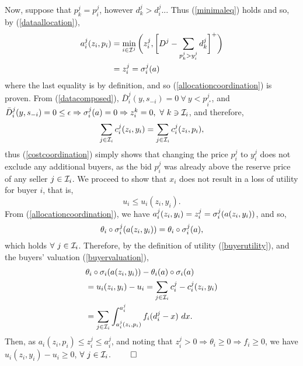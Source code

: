 {$$$$
Now, suppose that $p_k^j = p_i^j$, however $d_k^j > d_i^j$...
\fi
Thus (\ref{minimaleq}) holds and so, by (\ref{dataallocation}),
\begin{align*}
     a_i^j(z_i,p_i) &=\min_{i\in\mathcal{I}^j}\bigg(z_i^j, \bigg\lbrack D^{j} - \sum_{p_k^{j}> y_i^{j}}
d_k^{j}\bigg\rbrack^+\bigg) \\
    &= z_i^{j}= \sigma_i^{j}(a)
\end{align*}
where the last equality is by definition, and so (\ref{allocationcoordination}) is proven.
From (\ref{datacomposed}), $\bar{D}_i^j(y, s_{-i}) =
0 \ \forall \ y < p_{i^*}^j$, and $\bar{D}_i^j(y, s_{-i}) =0 \le \epsilon
\Rightarrow \sigma_i^j(a) = 0 \Rightarrow z_i^k = 0, \ \forall \ k \ni \mathcal{I}_i$, and therefore,
\begin{align*}
    \displaystyle\sum_{j\in\mathcal{I}_i} c_i^j(z_i,y_i) =\sum_{j\in\mathcal{I}_i}
c_i^j(z_i,p_i),
\end{align*}
thus (\ref{costcoordination}) simply shows that changing the price $p^j_i$ to $y^j_i$ does not exclude any
additional buyers, as the bid $p^j_i$ was already above the reserve price of any
seller $j \in \mathcal{I}_i$.
We proceed to show that $x_i$ does not result in a loss of utility for
buyer $i$, that is,
$$
    u_i \le u_i(z_i,y_i).
$$
From (\ref{allocationcoordination}), we have $a_i^{j}(z_i,y_i) = z_i^{j} = \sigma_i^j(a(z_i,y_i))$, 
and so,
$$
    \theta_i\circ \sigma_i^j(a(z_i,y_i)) = \theta_i\circ \sigma_i^j(a),
$$ 
which holds $\forall \ j\in\mcI_i$.
Therefore, by the definition of utility (\ref{buyerutility}),
and the buyers' valuation (\ref{buyervaluation}), 
\begin{align*}
    &\theta_i\circ \sigma_i(a(z_i,y_i)) - \theta_i(a)\circ \sigma_i(a) \\
    &= u_i(z_i,y_i) - u_i =  \displaystyle\sum_{j\in\mathcal{I}_i} c_i^j -c_i^{j}(z_i,y_i)\\
    &= \sum_{j\in\mathcal{I}_i}\int_{a_i^j(z_i,p_i)}^{a_i^j} f_i(d_i^j - x) \ dx.
\end{align*}
Then, as $a_i(z_i,p_i) \le z_i^j \le a_i^j $, and noting that
$z_i^j>0\Rightarrow \theta_i\ge 0\Rightarrow f_i\ge 0$, we have $u_i(z_i,y_i) - u_i \ge 0$, $\forall \ j\in\mcI_i$.
$\qed$}

